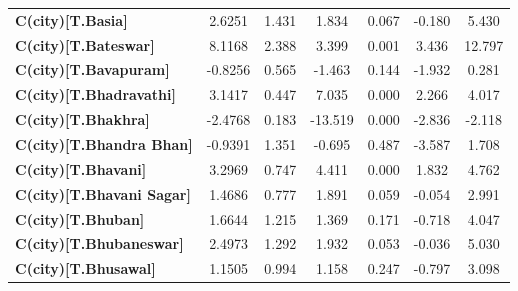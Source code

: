 \begin{center}
\begin{tabular}{lcccccc}
\textbf{C(city)[T.Basia]}                                                                           &       2.6251  &        1.431     &     1.834  &         0.067        &       -0.180    &        5.430     \\
\textbf{C(city)[T.Bateswar]}                                                                        &       8.1168  &        2.388     &     3.399  &         0.001        &        3.436    &       12.797     \\
\textbf{C(city)[T.Bavapuram]}                                                                       &      -0.8256  &        0.565     &    -1.463  &         0.144        &       -1.932    &        0.281     \\
\textbf{C(city)[T.Bhadravathi]}                                                                     &       3.1417  &        0.447     &     7.035  &         0.000        &        2.266    &        4.017     \\
\textbf{C(city)[T.Bhakhra]}                                                                         &      -2.4768  &        0.183     &   -13.519  &         0.000        &       -2.836    &       -2.118     \\
\textbf{C(city)[T.Bhandra Bhan]}                                                                    &      -0.9391  &        1.351     &    -0.695  &         0.487        &       -3.587    &        1.708     \\
\textbf{C(city)[T.Bhavani]}                                                                         &       3.2969  &        0.747     &     4.411  &         0.000        &        1.832    &        4.762     \\
\textbf{C(city)[T.Bhavani Sagar]}                                                                   &       1.4686  &        0.777     &     1.891  &         0.059        &       -0.054    &        2.991     \\
\textbf{C(city)[T.Bhuban]}                                                                          &       1.6644  &        1.215     &     1.369  &         0.171        &       -0.718    &        4.047     \\
\textbf{C(city)[T.Bhubaneswar]}                                                                     &       2.4973  &        1.292     &     1.932  &         0.053        &       -0.036    &        5.030     \\
\textbf{C(city)[T.Bhusawal]}                                                                        &       1.1505  &        0.994     &     1.158  &         0.247        &       -0.797    &        3.098     \\

\end{tabular}
\end{center}
